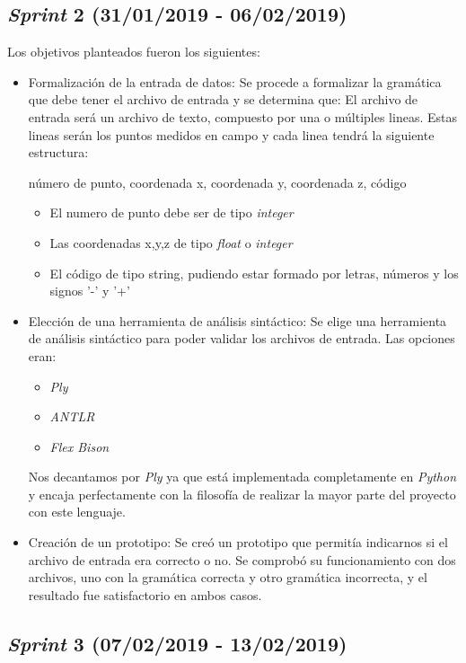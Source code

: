 \subsection{\emph{Sprint} 2 (31/01/2019 - 06/02/2019)}

Los objetivos planteados fueron los siguientes:

\begin{itemize}
\item Formalización de la entrada de datos: Se procede a formalizar la gramática que debe tener el archivo de entrada y se determina que:
El archivo de entrada será un archivo de texto, compuesto por una o múltiples lineas. Estas lineas serán los puntos medidos en campo y cada linea tendrá la siguiente estructura:

número de punto, coordenada x, coordenada y, coordenada z, código
\begin{itemize}
\item El numero de punto debe ser de tipo \emph{integer}
\item Las coordenadas x,y,z de tipo \emph{float} o \emph{integer}
\item El código de tipo string, pudiendo estar formado por letras, números y los signos '-' y '+'
\end{itemize}

\item Elección de una herramienta de análisis sintáctico: Se elige una herramienta de análisis sintáctico para poder validar los archivos de entrada. Las opciones eran:
\begin{itemize}
\item \emph{Ply}
\item \emph{ANTLR}
\item \emph{Flex Bison}
\end{itemize}
Nos decantamos por \emph{Ply} ya que está implementada completamente
en \emph{Python} y encaja perfectamente con la filosofía de realizar la mayor parte del proyecto con este lenguaje.

\item Creación de un prototipo: Se creó un prototipo que permitía indicarnos si el archivo de entrada era correcto o no. Se comprobó su funcionamiento con dos archivos, uno con la gramática correcta y otro gramática incorrecta, y el resultado fue satisfactorio en ambos casos. 

\end{itemize}


\subsection{\emph{Sprint} 3 (07/02/2019 - 13/02/2019)}

